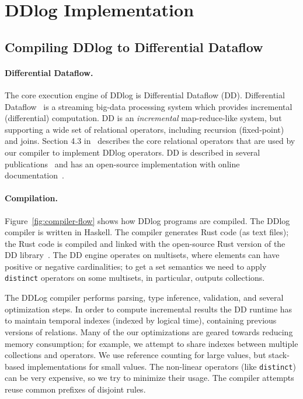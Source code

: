 \section{DDlog Implementation}\label{sec-system}

\subsection{Compiling DDlog to Differential Dataflow}

\paragraph{Differential Dataflow.}
The core execution engine of DDlog is Differential Dataflow (DD).
Differential Dataflow~\cite{differential-dataflow-paper} is a
streaming big-data processing system which provides incremental
(differential) computation.  DD is an \emph{incremental}
map-reduce-like system, but supporting a wide set of relational
operators, including recursion (fixed-point) and joins.  Section 4.3
in~\cite{differential-dataflow-paper} describes the core relational
operators that are used by our compiler to implement DDlog operators.
DD is described in several
publications~\cite{timely-dataflow,differential-dataflow-paper} and
has an open-source implementation with online
documentation~\cite{dd-mdbook,dd-reference}.

\paragraph{Compilation.}
Figure~\ref{fig:compiler-flow} shows how DDlog programs are compiled.
The DDlog compiler is written in Haskell.  The compiler generates Rust
code (as text files); the Rust code is compiled and linked with the
open-source Rust version of the DD
library~\cite{differential-dataflow}.  The DD engine operates on
multisets, where elements can have positive or negative cardinalities;
to get a set semantics we need to apply \texttt{distinct} operators on
some multisets, in particular, outputs collections.

The DDLog compiler performs parsing, type inference, validation, and
several optimization steps.  In order to compute incremental results
the DD runtime has to maintain temporal indexes (indexed by logical
time), containing previous versions of relations.  Many of the our
optimizations are geared towards reducing memory consumption; for
example, we attempt to share indexes between multiple collections and
operators.  We use reference counting for large values, but
stack-based implementations for small values.  The non-linear
operators (like \texttt{distinct}) can be very expensive, so we try to
minimize their usage.  The compiler attempts reuse common prefixes of
disjoint rules.

